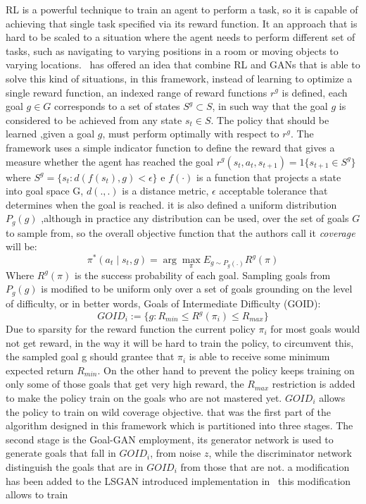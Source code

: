 RL is a powerful technique to train an agent to perform a task, so it is capable of achieving that single task specified via its reward function. It an approach that is hard to be scaled to a situation where the agent needs to perform different set of tasks,  such as navigating to varying positions in a room or moving objects to varying locations.~\cite{held2018automatic} has offered an idea that combine RL and GANs that is able to solve this kind of situations, in this framework, instead of learning to optimize a single reward function, an indexed range of reward functions $r^g$ is defined, each goal $g \in G$ corresponds to a set of states $S^g \subset S$, in such way that the goal $g$ is considered to be achieved from any state $s_t \in S$. The policy that should be learned ,given a goal $g$, must perform optimally with respect to $r^g$. The framework uses a simple indicator function to define the reward that gives a measure whether the agent has reached the goal $r^g(s_t, a_t, s_{t+1})=1 \{s_{t+1} \in S^g\}$ where $S^g = \{s_t : d(f(s_t), g)< \epsilon\}$ e $f(·)$ is a function that projects a state into goal space G, $d(.,.)$ is a distance metric, $\epsilon$ acceptable tolerance that determines when the goal is reached. it is also defined a uniform distribution $P_g(g)$ ,although in practice any distribution can be used, over the set of goals $G$ to sample from, so the overall objective function that the authors call it \textit{coverage} will be:
\begin{equation}
\pi^*(a_t \mid s_t, g)= \arg{\max_{\pi}}{E_{g\sim P_g(.)} R^g(\pi) }
\end{equation}
Where $R^g(\pi)$ is the success probability of each goal. Sampling goals from $P_g(g)$ is modified to be uniform only over a set of goals grounding on the level of difficulty, or in better words, Goals of Intermediate Difficulty (GOID):
\begin{equation}
GOID_i := \{ g : R_{min} \leqslant R^g(\pi_i) \leqslant R_{max}\}
\end{equation}
Due to sparsity for the reward function the current policy $\pi_i$ for most goals would not get reward, in the way it will be hard to train the policy, to circumvent this, the sampled goal g should grantee that $\pi_i$ is able to receive some minimum expected return $R_{min}$. On the other hand to prevent the policy keeps training on only some of those goals that get very high reward, the $R_{max}$ restriction is added to make the policy train on the goals who are not mastered yet. $GOID_i$ allows the policy to train on wild coverage objective. that was the first part of the algorithm designed in this framework which is partitioned into three stages. The second stage is the Goal-GAN employment, its generator network is used to generate goals that fall in $GOID_i$, from noise $z$, while the discriminator network distinguish the goals that are in $GOID_i$ from those that are not. a modification has been added to the LSGAN introduced implementation in~\citealp{Mao_2017_ICCV} this modification allows to train
